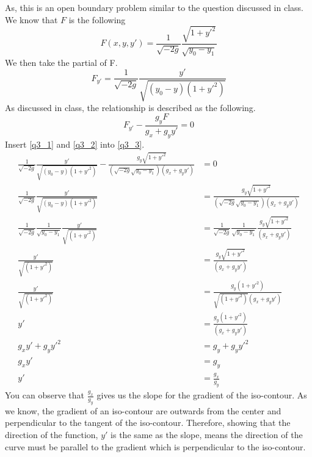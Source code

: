 As, this is an open boundary problem similar to the question discussed in class. We know that $F$ is the following
\begin{equation}\label{q3_1}
F(x,y,y') = \frac{1}{\sqrt{-2g}}\frac{\sqrt{1+y'^2}}{\sqrt{y_0 - y_1}}
\end{equation}
We then take the partial of F.
\begin{equation}\label{q3_2}
F_{y'} = \frac{1}{\sqrt{-2g}}\frac{y'}{\sqrt{(y_0 - y)(1 + y'^2)}}
\end{equation}
As discussed in class, the relationship is described as the following.
\begin{equation}\label{q3_3}
F_{y'} - \frac{g_y F}{g_x + g_y y'} = 0
\end{equation}
Insert \ref{q3_1} and \ref{q3_2} into \ref{q3_3}.
\begin{equation}
\begin{aligned}
\frac{1}{\sqrt{-2g}}\frac{y'}{\sqrt{(y_0 - y)(1 + y'^2)}} - \frac{g_y \sqrt{1+y'^2}}{(\sqrt{-2g}\sqrt{y_0 - y_1})(g_x + g_y y')} &= 0\\
\frac{1}{\sqrt{-2g}}\frac{y'}{\sqrt{(y_0 - y)(1 + y'^2)}} &= \frac{g_y \sqrt{1+y'^2}}{(\sqrt{-2g}\sqrt{y_0 - y_1})(g_x + g_y y')}\\
\frac{1}{\sqrt{-2g}} \frac{1}{\sqrt{y_0 - y_1}} \frac{y'}{\sqrt{(1 + y'^2)}} &= \frac{1}{\sqrt{-2g}} \frac{1}{\sqrt{y_0 - y_1}} \frac{g_y \sqrt{1+y'^2}}{(g_x + g_y y')}\\
\frac{y'}{\sqrt{(1 + y'^2)}} &= \frac{g_y \sqrt{1+y'^2}}{(g_x + g_y y')}\\
\frac{y'}{\sqrt{(1 + y'^2)}} &= \frac{g_y(1+y'^2)}{\sqrt{(1 + y'^2)}(g_x + g_y y')}\\
y' &= \frac{g_y(1+y'^2)}{(g_x + g_y y')}\\
g_xy' + g_yy'^2 &= g_y + g_yy'^2\\
g_xy' &= g_y\\
y' &= \frac{g_x}{g_y}
\end{aligned}
\end{equation}
You can observe that $\frac{g_x}{g_y}$ gives us the slope for the gradient of the iso-contour. As we know, the gradient of an iso-contour are outwards from the center and perpendicular to the tangent of the iso-contour. Therefore, showing that the direction of the function, $y'$ is the same as the slope, means the direction of the curve must be parallel to the gradient which is perpendicular to the iso-contour.
